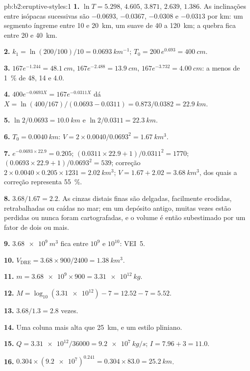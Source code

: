 \begin{solution}{pb:b2:eruptive-styles:1}
\textbf{1.} $\ln T = 5.298$, $4.605$, $3.871$, $2.639$, $1.386$. As inclinações entre
isópacas sucessivas são $-0.0693$, $-0.0367$, $-0.0308$ e $-0.0313$ por km: um
segmento íngreme entre 10 e \qty{20}{km}, um suave de 40 a
\qty{120}{km}; a quebra fica entre 20 e \qty{40}{km}.

\textbf{2.} $k_1 = \ln(200/100)/10 = \qty{0.0693}{km^{-1}}$; $T_0 = 200\,e^{0.693} =
\qty{400}{cm}$.

\textbf{3.} $167e^{-1.244} = \qty{48.1}{cm}$, $167e^{-2.488} = \qty{13.9}{cm}$,
$167e^{-3.732} = \qty{4.00}{cm}$: a menos de \qty{1}{\percent} de 48, 14 e 4.0.

\textbf{4.} $400e^{-0.0693X} = 167e^{-0.0311X}$ dá $X = \ln(400/167)/(0.0693 -
0.0311) = 0.873/0.0382 = \qty{22.9}{km}$.

\textbf{5.} $\ln2/0.0693 = \qty{10.0}{km}$ e $\ln2/0.0311 = \qty{22.3}{km}$.

\textbf{6.} $T_0 = \qty{0.0040}{km}$: $V = 2\times0.0040/0.0693^2 =
\qty{1.67}{km^3}$.

\textbf{7.} $e^{-0.0693\times22.9} = 0.205$; $(0.0311\times22.9 + 1)/0.0311^2 = 1770$;
$(0.0693\times22.9 + 1)/0.0693^2 = 539$; correção $2\times0.0040\times0.205\times1231 =
\qty{2.02}{km^3}$; $V = 1.67 + 2.02 = \qty{3.68}{km^3}$, dos quais a correção representa
\qty{55}{\percent}.

\textbf{8.} $3.68/1.67 = 2.2$. As cinzas distais finas são delgadas, facilmente erodidas,
retrabalhadas ou caídas no mar; em um depósito antigo, muitas vezes estão perdidas ou nunca foram
cartografadas, e o volume é então subestimado por um fator de dois ou mais.

\textbf{9.} $\qty{3.68e9}{m^3}$ fica entre $10^9$ e $10^{10}$: VEI~5.

\textbf{10.} $V_{\mathrm{DRE}} = 3.68\times900/2400 = \qty{1.38}{km^3}$.

\textbf{11.} $m = \num{3.68e9}\times900 = \qty{3.31e12}{kg}$.

\textbf{12.} $M = \log_{10}(\num{3.31e12}) - 7 = 12.52 - 7 = 5.52$.

\textbf{13.} $3.68/1.3 = 2.8$ vezes.

\textbf{14.} Uma coluna mais alta que \qty{25}{km}, e um estilo pliniano.

\textbf{15.} $Q = \num{3.31e12}/36000 = \qty{9.2e7}{kg/s}$; $I = 7.96 + 3 = 11.0$.

\textbf{16.} $0.304\times(\num{9.2e7})^{0.241} = 0.304\times83.0 = \qty{25.2}{km}$.


\end{solution}
